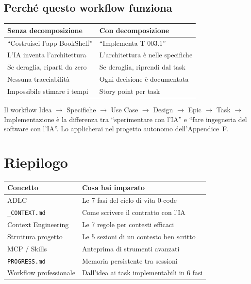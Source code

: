 \subsection{Perché questo workflow funziona}

\begin{center}
\begin{tabularx}{\textwidth}{X X}
\toprule
\textbf{Senza decomposizione} & \textbf{Con decomposizione} \\
\midrule
``Costruisci l'app BookShelf'' & ``Implementa T-003.1'' \\
L'IA inventa l'architettura & L'architettura è nelle specifiche \\
Se deraglia, riparti da zero & Se deraglia, riprendi dal task \\
Nessuna tracciabilità & Ogni decisione è documentata \\
Impossibile stimare i tempi & Story point per task \\
\bottomrule
\end{tabularx}
\end{center}

\begin{checkpointbox}
Il workflow Idea $\rightarrow$ Specifiche $\rightarrow$ Use Case $\rightarrow$ Design $\rightarrow$ Epic $\rightarrow$ Task $\rightarrow$ Implementazione è la differenza tra ``sperimentare con l'IA'' e ``fare ingegneria del software con l'IA''. Lo applicherai nel progetto autonomo dell'Appendice~F.
\end{checkpointbox}

\section*{Riepilogo}

\begin{center}
\begin{tabularx}{\textwidth}{l X}
\toprule
\textbf{Concetto} & \textbf{Cosa hai imparato} \\
\midrule
ADLC & Le 7 fasi del ciclo di vita 0-code \\
\texttt{\_CONTEXT.md} & Come scrivere il contratto con l'IA \\
Context Engineering & Le 7 regole per contesti efficaci \\
Struttura progetto & Le 5 sezioni di un contesto ben scritto \\
MCP / Skills & Anteprima di strumenti avanzati \\
\texttt{PROGRESS.md} & Memoria persistente tra sessioni \\
Workflow professionale & Dall'idea ai task implementabili in 6 fasi \\
\bottomrule
\end{tabularx}
\end{center}
